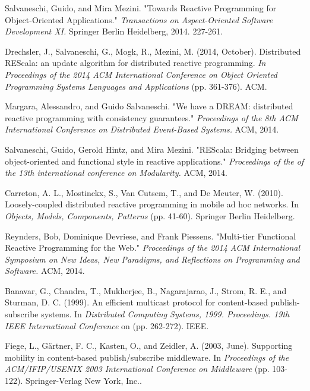 \documentclass{sigplanconf}
\begin{document}



\begin{thebibliography}{}
\softraggedright

 Salvaneschi, Guido, and Mira Mezini. "Towards Reactive Programming for Object-Oriented Applications." {\em Transactions on Aspect-Oriented Software Development XI.} Springer Berlin Heidelberg, 2014. 227-261.

 Drechsler, J., Salvaneschi, G., Mogk, R.,  Mezini, M. (2014, October). Distributed REScala: an update algorithm for distributed reactive programming. {\em  In Proceedings of the 2014 ACM International Conference on Object Oriented Programming Systems Languages and Applications} (pp. 361-376). ACM.

 Margara, Alessandro, and Guido Salvaneschi. "We have a DREAM: distributed reactive programming with consistency guarantees." {\em Proceedings of the 8th ACM International Conference on Distributed Event-Based Systems.} ACM, 2014.

 Salvaneschi, Guido, Gerold Hintz, and Mira Mezini. "REScala: Bridging between object-oriented and functional style in reactive applications." {\em Proceedings of the of the 13th international conference on Modularity.} ACM, 2014.

 Carreton, A. L., Mostinckx, S., Van Cutsem, T., and De Meuter, W. (2010). Loosely-coupled distributed reactive programming in mobile ad hoc networks. In {\em Objects, Models, Components, Patterns } (pp. 41-60). Springer Berlin Heidelberg.

 Reynders, Bob, Dominique Devriese, and Frank Piessens. "Multi-tier Functional Reactive Programming for the Web." {\em  Proceedings of the 2014 ACM International Symposium on New Ideas, New Paradigms, and Reflections on Programming and Software.} ACM, 2014.

 Banavar, G., Chandra, T., Mukherjee, B., Nagarajarao, J., Strom, R. E., and Sturman, D. C. (1999). An efficient multicast protocol for content-based publish-subscribe systems. In {\em Distributed Computing Systems, 1999. Proceedings. 19th IEEE International Conference} on (pp. 262-272). IEEE.

 Fiege, L., Gärtner, F. C., Kasten, O., and Zeidler, A. (2003, June). Supporting mobility in content-based publish/subscribe middleware. In {\em Proceedings of the ACM/IFIP/USENIX 2003 International Conference on Middleware } (pp. 103-122). Springer-Verlag New York, Inc..


\end{thebibliography}
\end{document}
